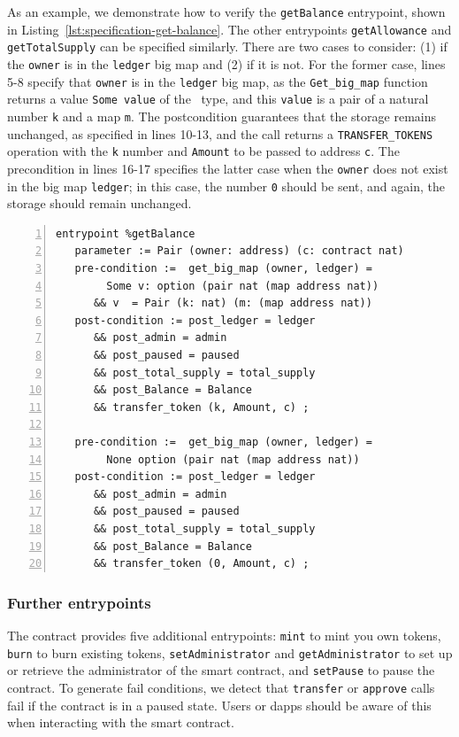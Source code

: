 \documentclass[a4paper,USenglish,cleveref, autoref, thm-restate]{lipics-v2021}
\begin{document}
As an example, we demonstrate how to verify the \lstinline/getBalance/
entrypoint,  shown in Listing~\ref{lst:specification-get-balance}. The
other entrypoints \lstinline/getAllowance/ and
\lstinline/getTotalSupply/ can be specified similarly.  There are two
cases to consider: (1) if the \lstinline/owner/ is in the
\lstinline/ledger/ big map and (2) if it is not. For the former case,
lines 5-8 specify that \lstinline/owner/ is in the \lstinline/ledger/
big map, as the \lstinline/Get_big_map/ function returns a value
\lstinline/Some value/ of the \TOPTION\ type, and this
\lstinline/value/ is a pair of a natural number \lstinline/k/ and a
map \lstinline/m/. The postcondition guarantees that the storage
remains unchanged, as specified in lines 10-13, and the call returns a
\lstinline/TRANSFER_TOKENS/ operation with the \lstinline/k/ number
and \lstinline/Amount/ to be passed to address \lstinline/c/. The
precondition in lines 16-17 specifies the latter case when the
\lstinline/owner/ does not exist in the big map \lstinline/ledger/; in
this case, the number \lstinline/0/ should be sent, and again, the
storage should remain unchanged. 

\begin{lstlisting}[float=tp,captionpos=b,caption={Specification of the \lstinline/getBalance/ entrypoint},label={lst:specification-get-balance},numbers=left]
entrypoint %getBalance
   parameter := Pair (owner: address) (c: contract nat)
   pre-condition :=  get_big_map (owner, ledger) = 
        Some v: option (pair nat (map address nat)) 
      && v  = Pair (k: nat) (m: (map address nat))
   post-condition := post_ledger = ledger 
      && post_admin = admin 
      && post_paused = paused 
      && post_total_supply = total_supply 
      && post_Balance = Balance 
      && transfer_token (k, Amount, c) ;

   pre-condition :=  get_big_map (owner, ledger) = 
        None option (pair nat (map address nat)) 
   post-condition := post_ledger = ledger 
      && post_admin = admin 
      && post_paused = paused 
      && post_total_supply = total_supply 
      && post_Balance = Balance 
      && transfer_token (0, Amount, c) ;
\end{lstlisting}
\subsubsection{Further entrypoints}
\label{sec:other-entrypoints}

The contract provides five additional entrypoints: \lstinline/mint/ to
mint you own tokens, \lstinline/burn/ to burn existing tokens,
\lstinline/setAdministrator/ and \lstinline/getAdministrator/ to set
up or retrieve the administrator of the smart contract, and
\lstinline/setPause/ to pause the contract. To generate fail
conditions, we detect that \lstinline/transfer/ or \lstinline/approve/
calls fail if the contract is in a paused state. Users or dapps should
be aware of this when interacting with the smart contract. 
\end{document}
